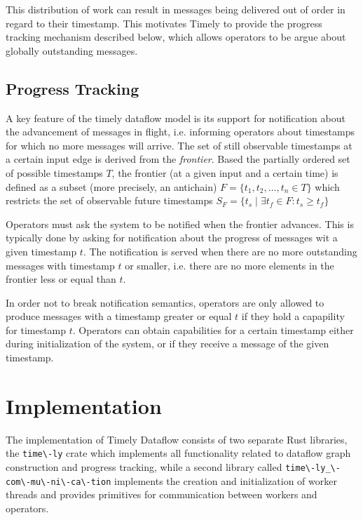 \begin{addedbar}
This distribution of work can result in messages being delivered out of
order in regard to their timestamp. This motivates Timely to provide the
progress tracking mechanism described below, which allows operators to
be argue about globally outstanding messages.

\subsection{Progress Tracking}

A key feature of the timely dataflow model is its support for notification
about the advancement of messages in flight, i.e. informing operators about
timestamps for which no more messages will arrive. The set of still observable
timestamps at a certain input edge is derived from the \emph{frontier}. Based 
the partially ordered set of possible timestamps $T$, the frontier (at a given
input and a certain time) is defined as a subset (more precisely, an antichain)
$F = \{t_1, t_2, \dots, t_n \in T \}$
which restricts the set of observable future timestamps
$S_F = \{ t_s \mid \exists t_f \in F: t_s \geq t_f \}$

Operators must ask the system to be notified when the frontier advances. This
is typically done by asking for notification about the progress of messages wit
a given timestamp $t$. The
notification is served when there are no more outstanding messages with
timestamp $t$ or smaller, i.e. there are no more elements in the frontier less
or equal than $t$.

In order not to break notification semantics, operators are only allowed to
produce messages with a timestamp greater or equal $t$ if they hold a
capapility for timestamp $t$. Operators can obtain capabilities for a certain
timestamp either during initialization of the system, or if they receive a
message of the given timestamp.

\section{Implementation}

The implementation of Timely Dataflow consists of two separate Rust libraries,
the \lstinline{time\-ly} crate which implements all functionality related to
dataflow graph construction and progress tracking, while a second library
called \lstinline{time\-ly_\-com\-mu\-ni\-ca\-tion} implements the creation and
initialization of worker threads and provides primitives for communication
between workers and operators. 


\end{addedbar}
